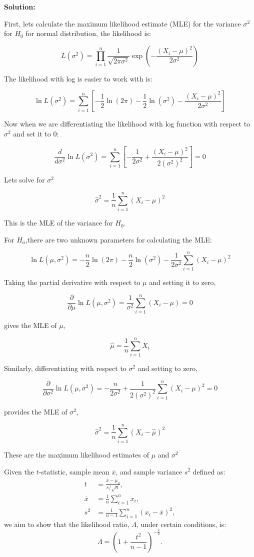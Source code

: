 \textbf{Solution:}

First, lets calculate the maximum likelihood estimate (MLE) for the variance $\sigma^2$ for $H_0$ for normal distribution, the likelihood is:

\[ L(\sigma^2) = \prod_{i=1}^{n} \frac{1}{\sqrt{2\pi\sigma^2}} \exp\left(-\frac{(X_i - \mu)^2}{2\sigma^2}\right) \]

The likelihood with log is easier to work with is:

\[ \ln L(\sigma^2) = \sum_{i=1}^{n} \left[ -\frac{1}{2} \ln(2\pi) - \frac{1}{2} \ln(\sigma^2) - \frac{(X_i - \mu)^2}{2\sigma^2} \right] \]

Now when we are differentiating the likelihood with log function with respect to $\sigma^2$ and set it to 0:

\[ \frac{d}{d\sigma^2} \ln L(\sigma^2) = \sum_{i=1}^{n} \left[ -\frac{1}{2\sigma^2} + \frac{(X_i - \mu)^2}{2(\sigma^2)^2} \right] = 0 \]

Lets solve for $\sigma^2$

\[ \hat{\sigma}^2 = \frac{1}{n} \sum_{i=1}^{n} (X_i - \mu)^2 \]

This is the MLE of the variance for $H_0$.

For $H_a$,there are two unknown parameters for calculating the MLE: 

\[ \ln L(\mu, \sigma^2) = -\frac{n}{2} \ln(2\pi) - \frac{n}{2} \ln(\sigma^2) - \frac{1}{2\sigma^2} \sum_{i=1}^{n} (X_i - \mu)^2 \]

Taking the partial derivative with respect to $\mu$ and setting it to zero,

\[ \frac{\partial}{\partial \mu} \ln L(\mu, \sigma^2) = \frac{1}{\sigma^2} \sum_{i=1}^{n} (X_i - \mu) = 0 \]

gives the MLE of $\mu$,

\[ \hat{\mu} = \frac{1}{n} \sum_{i=1}^{n} X_i \]

Similarly, differentiating with respect to $\sigma^2$ and setting to zero,

\[ \frac{\partial}{\partial \sigma^2} \ln L(\mu, \sigma^2) = -\frac{n}{2\sigma^2} + \frac{1}{2(\sigma^2)^2} \sum_{i=1}^{n} (X_i - \mu)^2 = 0 \]

provides the MLE of $\sigma^2$,

\[ \hat{\sigma}^2 = \frac{1}{n} \sum_{i=1}^{n} (X_i - \hat{\mu})^2 \]

These are the maximum likelihood estimates of $\mu$ and $\sigma^2$ 

Given the $t$-statistic, sample mean $\overline{x}$, and sample variance $s^2$ defined as:
\begin{align*}
t &= \frac{\overline{x} - \mu_0}{s/\sqrt{n}}, \\
\overline{x} &= \frac{1}{n}\sum_{i=1}^{n} x_i, \\
s^2 &= \frac{1}{n-1}\sum_{i=1}^{n} (x_i - \overline{x})^2,
\end{align*}
we aim to show that the likelihood ratio, $\Lambda$, under certain conditions, is:
\[ \Lambda = \left( 1+\frac{t^2}{n-1}\right)^{-\frac{n}{2}}. \]

